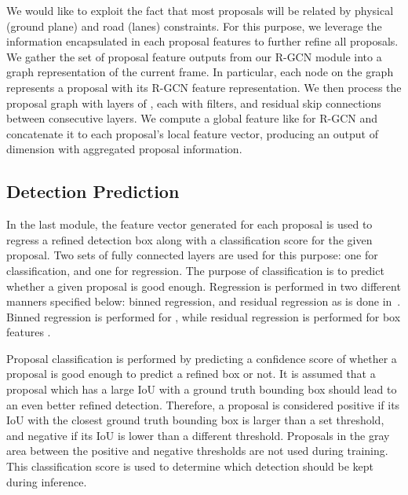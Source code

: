 \documentclass[10pt,twocolumn,letterpaper]{article}
\begin{document}
We would like to exploit the fact that most proposals will be related by physical (\eg ground plane) and road (\eg lanes) constraints.
For this purpose, we leverage the information encapsulated in each proposal features to further refine all proposals.
We gather the set of  proposal feature outputs from our R-GCN module into a graph representation of the current frame.
In particular, each node on the graph represents a proposal with its R-GCN feature representation.
We then process the proposal graph with  layers of \EdgeConv, each with  filters, and residual skip connections between consecutive layers.
We compute a global feature like for R-GCN and concatenate it to each proposal's local feature vector,  producing an output of dimension  with aggregated proposal information.














\subsection{Detection Prediction}
In the last module, the feature vector generated for each proposal is used to regress a refined detection box along with a classification score for the given proposal.
Two sets of fully connected layers are used for this purpose: one for classification, and one for regression.
The purpose of classification is to predict whether a given proposal is good enough.
Regression is performed in two different manners specified below: binned regression, and residual regression as is done in~\cite{shi2019pointrcnn}.
Binned regression is performed for , while residual regression is performed for box features .

Proposal classification is performed by predicting a confidence score of whether a proposal is good enough to predict a refined box or not.
It is assumed that a proposal which has a large IoU with a ground truth bounding box should lead to an even better refined detection.
Therefore, a proposal is considered positive if its IoU with the closest ground truth bounding box is larger than a set threshold, and negative if its IoU is lower than a different threshold.
Proposals in the gray area between the positive and negative thresholds are not used during training.
This classification score is used to determine which detection should be kept during inference.
\end{document}
